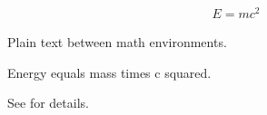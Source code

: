 \documentclass{article}
\begin{document}
\begin{align}
E = mc^2
\end{align}

Plain text between math environments.

\begin{theorem}
\label{thm:energy}
Energy equals mass times c squared.
\end{theorem}

See  for details.
\end{document}
